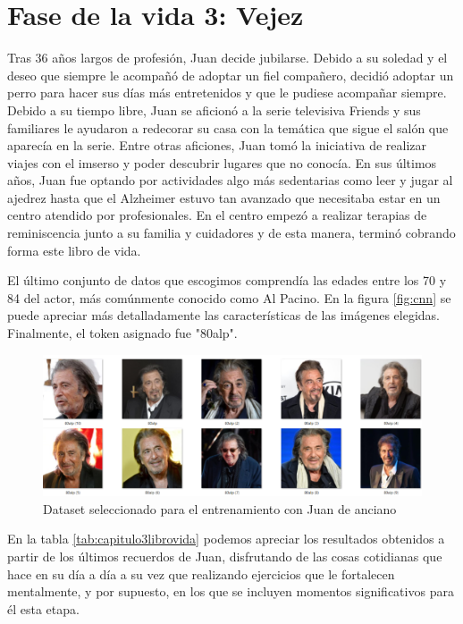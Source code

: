 \section{Fase de la vida 3: Vejez}
Tras 36 años largos de profesión, Juan decide jubilarse. Debido a su soledad y el deseo que siempre le acompañó de adoptar un fiel compañero, decidió adoptar un perro para hacer sus días más entretenidos y que le pudiese acompañar siempre. Debido a su tiempo libre, Juan se aficionó a la serie televisiva Friends y sus familiares le ayudaron a redecorar su casa con la temática que sigue el salón que aparecía en la serie. Entre otras aficiones, Juan tomó la iniciativa de realizar viajes con el imserso y poder descubrir lugares que no conocía. En sus últimos años, Juan fue optando por actividades algo más sedentarias como leer y jugar al ajedrez hasta que el Alzheimer estuvo tan avanzado que necesitaba estar en un centro atendido por profesionales. En el centro empezó a realizar terapias de reminiscencia junto a su familia y cuidadores y de esta manera, terminó cobrando forma este libro de vida. 

El último conjunto de datos que escogimos comprendía las edades entre los 70 y 84 del actor, más comúnmente conocido como Al Pacino. En la figura \ref{fig:cnn} se puede apreciar más detalladamente las características de las imágenes elegidas. Finalmente, el token asignado fue "80alp". \\

\begin{figure}[!htb]
	\centering
	\includegraphics[width = 1
	\textwidth]{Imagenes/Vectorial/dataset_80alp.png}
	\caption{Dataset seleccionado para el entrenamiento con Juan de anciano}
	\label{fig:dataset80alp}
\end{figure}

En la tabla \ref*{tab:capitulo3librovida} podemos apreciar los resultados obtenidos a partir de los últimos recuerdos de Juan, disfrutando de las cosas cotidianas que hace en su día a día a su vez que realizando ejercicios que le fortalecen mentalmente, y por supuesto, en los que se incluyen momentos significativos para él esta etapa. \\


